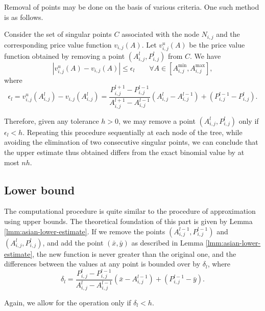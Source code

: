 Removal of points may be done on the basis of various criteria. One such method is as follows.

Consider the set of singular points $ C $ associated with the node $ N_{i,j} $ and the corresponding price value function $ v_{i,j} (A) $. Let $ v_{i,j}^u (A) $ be the price value function obtained by removing a point $ \left( A_{i,j}^{l}, P_{i,j}^{l} \right) $ from $ C $. We have
\begin{equation}
	\left| v_{i,j}^u (A) - v_{i,j} (A) \right|  \le  \epsilon_l  \qquad  \forall A \in \left[ A_{i,j}^{\min}, A_{i,j}^{\max} \right],
\end{equation}
where
\begin{equation}
	\epsilon_l  =  v_{i,j}^u \left( A_{i,j}^{l} \right) - v_{i,j} \left( A_{i,j}^{l} \right)  =  \frac{ P_{i,j}^{l+1} - P_{i,j}^{l-1} }{ A_{i,j}^{l+1} - A_{i,j}^{l-1} } \left( A_{i,j}^{l} - A_{i,j}^{l-1} \right) + \left( P_{i,j}^{l-1} - P_{i,j}^{l} \right) .
\end{equation}

Therefore, given any tolerance $ h > 0 $, we may remove a point $ \left( A_{i,j}^{l}, P_{i,j}^{l} \right) $ only if $ \epsilon_l < h $. Repeating this procedure sequentially at each node of the tree, while avoiding the elimination of two consecutive singular points, we can conclude that the upper estimate thus obtained differs from the exact binomial value by at most $ n h $.


\subsection{Lower bound}
\label{subsec:asian-lb}
The computational procedure is quite similar to the procedure of approximation using upper bounds. The theoretical foundation of this part is given by Lemma \ref{lmm:asian-lower-estimate}. If we remove the points $ \left( A_{i,j}^{l-1}, P_{i,j}^{l-1} \right) $ and $ \left( A_{i,j}^{l}, P_{i,j}^{l} \right) $, and add the point $ (\bar{x}, \bar{y} ) $ as described in Lemma \ref{lmm:asian-lower-estimate}, the new function is never greater than the original one, and the differences between the values at any point is bounded over by $ \delta_l $, where
\begin{equation}
	\delta_l  =  \frac{ P_{i,j}^{l} - P_{i,j}^{l-1} }{ A_{i,j}^{l} - A_{i,j}^{l-1} } \left( \bar{x} - A_{i,j}^{l-1} \right) + \left( P_{i,j}^{l-1} - \bar{y} \right) .
\end{equation}

Again, we allow for the operation only if $ \delta_l < h $.


